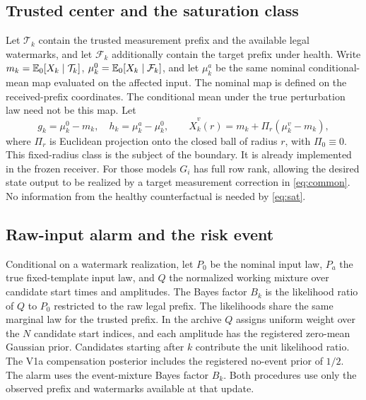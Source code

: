 \subsection{Trusted center and the saturation class}

Let \(\mathcal T_k\) contain the trusted measurement prefix and the available legal watermarks, and let \(\mathcal F_k\) additionally contain the target prefix under health. Write \(m_k=\mathbb{E}_0[X_k\mid\mathcal T_k]\), \(\mu_k^0=\mathbb{E}_0[X_k\mid\mathcal F_k]\), and let \(\mu_k^a\) be the same nominal conditional-mean map evaluated on the affected input. The nominal map is defined on the received-prefix coordinates. The conditional mean under the true perturbation law need not be this map. Let
\begin{equation}
 g_k=\mu_k^0-m_k,\quad h_k=\mu_k^a-\mu_k^0,\qquad
 \widehat X_k^v(r)=m_k+\Pi_r(\mu_k^v-m_k),
 \label{eq:sat}
\end{equation}
where \(\Pi_r\) is Euclidean projection onto the closed ball of radius \(r\), with \(\Pi_0\equiv0\). This fixed-radius class is the subject of the boundary. It is already implemented in the frozen receiver. For those models \(G_i\) has full row rank, allowing the desired state output to be realized by a target measurement correction in \eqref{eq:common}. No information from the healthy counterfactual is needed by \eqref{eq:sat}.

\subsection{Raw-input alarm and the risk event}

Conditional on a watermark realization, let \(P_0\) be the nominal input law, \(P_a\) the true fixed-template input law, and \(Q\) the normalized working mixture over candidate start times and amplitudes. The Bayes factor \(B_k\) is the likelihood ratio of \(Q\) to \(P_0\) restricted to the raw legal prefix. The likelihoods share the same marginal law for the trusted prefix. In the archive \(Q\) assigns uniform weight over the \(N\) candidate start indices, and each amplitude has the registered zero-mean Gaussian prior. Candidates starting after \(k\) contribute the unit likelihood ratio. The V1a compensation posterior includes the registered no-event prior of \(1/2\). The alarm uses the event-mixture Bayes factor \(B_k\). Both procedures use only the observed prefix and watermarks available at that update.

